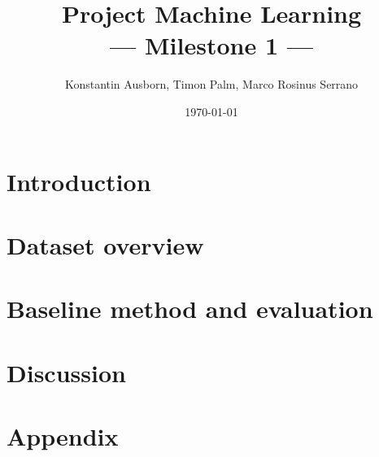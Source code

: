 \documentclass[10pt,a4paper,twoside]{article}
\title{Project Machine Learning\\--- Milestone 1 ---}
\author{Konstantin Ausborn, Timon Palm, Marco Rosinus Serrano}
\date{\today}
\begin{document}
    \maketitle
    \section{Introduction}\label{sec:introduction}
    
    \section{Dataset overview}\label{sec:dataset-overview}
    
    \section{Baseline method and evaluation}\label{sec:baseline-method-and-evaluation}
    
    \section{Discussion}\label{sec:discussion}
    
    
    \section{Appendix}\label{sec:appendix}
    


\end{document}
